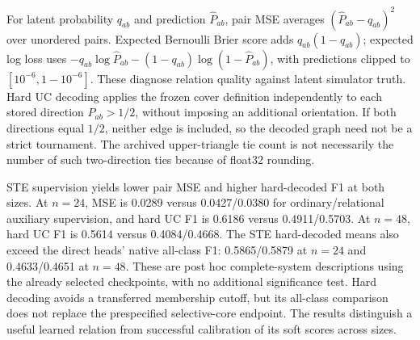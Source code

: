 \begin{table}[ht]\centering\small

\caption{Post hoc, descriptive all-class relation-quality and hard-decoding diagnostics for the selected systems. Hard UC uses each stored float32 direction $\widehat P_{ab}>1/2$ without the learned membership cutoff. Pair errors use latent simulated truth unavailable to the predictor. Ties count upper-triangle probabilities equal to $1/2$ per graph; numerical reciprocity can leave the reverse direction above $1/2$. These are not additional primary endpoints.}
\label{tab:uc-equalcompute-secondary}\end{table}

For latent probability $q_{ab}$ and prediction $\widehat P_{ab}$, pair MSE averages $(\widehat P_{ab}-q_{ab})^2$ over unordered pairs. Expected Bernoulli Brier score adds $q_{ab}(1-q_{ab})$; expected log loss uses $-q_{ab}\log\widehat P_{ab}-(1-q_{ab})\log(1-\widehat P_{ab})$, with predictions clipped to $[10^{-6},1-10^{-6}]$. These diagnose relation quality against latent simulator truth. Hard UC decoding applies the frozen cover definition independently to each stored direction $\widehat P_{ab}>1/2$, without imposing an additional orientation. If both directions equal $1/2$, neither edge is included, so the decoded graph need not be a strict tournament. The archived upper-triangle tie count is not necessarily the number of such two-direction ties because of float32 rounding.

STE supervision yields lower pair MSE and higher hard-decoded F1 at both sizes. At $n=24$, MSE is 0.0289 versus 0.0427/0.0380 for ordinary/relational auxiliary supervision, and hard UC F1 is 0.6186 versus 0.4911/0.5703. At $n=48$, hard UC F1 is 0.5614 versus 0.4084/0.4668. The STE hard-decoded means also exceed the direct heads' native all-class F1: 0.5865/0.5879 at $n=24$ and 0.4633/0.4651 at $n=48$. These are post hoc complete-system descriptions using the already selected checkpoints, with no additional significance test. Hard decoding avoids a transferred membership cutoff, but its all-class comparison does not replace the prespecified selective-core endpoint. The results distinguish a useful learned relation from successful calibration of its soft scores across sizes.

\begin{table}[ht]\centering\scriptsize

\caption{Post hoc diagnostics restricted to selective non-singleton cores. Native and hard readouts use the same selected weights; checkpoint selection was not repeated for hard decoding. Exact is complete-set recovery. Pair MSE is measured against latent simulated truth. Means average twelve collections, each averaging graphs and three initializations. No additional inferential tests are claimed.}
\label{tab:harddecode-selective}\end{table}

